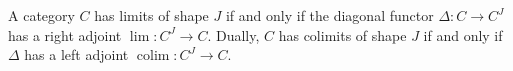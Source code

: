 A category $C$ has limits of shape $J$ if and only if the diagonal functor $\Delta: C \rightarrow C^J$ has a right adjoint $\lim: C^J \rightarrow C$. Dually, $C$ has colimits of shape $J$ if and only if $\Delta$ has a left adjoint $\operatorname{colim}: C^J \rightarrow C$.